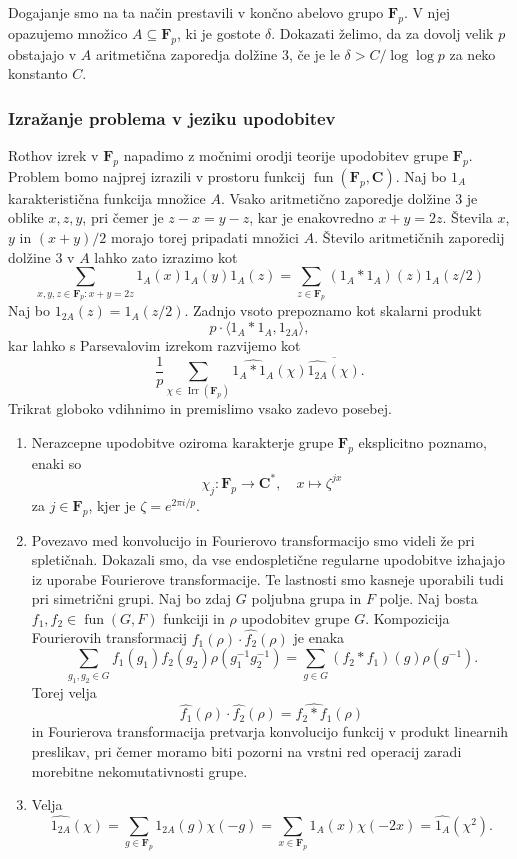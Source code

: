 \documentclass[11pt]{book}
\def\CC{\mathbf{C}}
\def\FF{\mathbf{F}}
\DeclareMathOperator\Irr{Irr}
\DeclareMathOperator\fun{fun}
\theoremstyle{definition}
\theoremstyle{zgled}
\theoremstyle{odprtproblem}
\theoremstyle{domacanaloga}
\theoremstyle{izrek}
\begin{document}
Dogajanje smo na ta način prestavili v končno abelovo grupo $\FF_p$. V njej opazujemo množico $A \subseteq \FF_p$, ki je gostote $\delta$. Dokazati želimo, da za dovolj velik $p$ obstajajo v $A$ aritmetična zaporedja dolžine $3$, če je le $\delta > C/\log \log p$ za neko konstanto $C$. 

\subsubsection{Izražanje problema v jeziku upodobitev}

Rothov izrek v $\FF_p$ napadimo z močnimi orodji teorije upodobitev grupe $\FF_p$. Problem bomo najprej izrazili v prostoru funkcij $\fun(\FF_p, \CC)$. Naj bo $1_A$ karakteristična funkcija množice $A$. Vsako aritmetično zaporedje dolžine $3$ je oblike $x,z,y$, pri čemer je $z-x = y-z$, kar je enakovredno $x+y=2z$. Števila $x$, $y$ in $(x+y)/2$ morajo torej pripadati množici $A$. Število aritmetičnih zaporedij dolžine $3$ v $A$ lahko zato izrazimo kot
\[
    \sum_{x,y,z \in \FF_p : x+y=2z} 1_A(x) 1_A(y) 1_A(z)
    = \sum_{z \in \FF_p} \left( 1_A * 1_A \right)(z) 1_A(z/2)
\]
Naj bo $1_{2A}(z) = 1_A(z/2)$. Zadnjo vsoto prepoznamo kot skalarni produkt
\[
    p \cdot \langle 1_A * 1_A, 1_{2A} \rangle,
\]
kar lahko s Parsevalovim izrekom razvijemo kot
\[
    \frac{1}{p} \sum_{\chi \in \Irr(\FF_p)} \widehat{1_A*1_A}(\chi) \overline{\widehat{1_{2A}}(\chi)}.
\]
Trikrat globoko vdihnimo in premislimo vsako zadevo posebej. 

\begin{enumerate}
\item Nerazcepne upodobitve oziroma karakterje grupe $\FF_p$ eksplicitno poznamo, enaki so
\[
    \chi_j \colon \FF_p \to \CC^*, \quad
    x \mapsto \zeta^{j x}
\]
za $j \in \FF_p$, kjer je $\zeta = e^{2 \pi i/p}$. 

\item Povezavo med konvolucijo in Fourierovo transformacijo smo videli že pri spletičnah. Dokazali smo, da vse endospletične regularne upodobitve izhajajo iz uporabe Fourierove transformacije. Te lastnosti smo kasneje uporabili tudi pri simetrični grupi. Naj bo zdaj $G$ poljubna grupa in $F$ polje. Naj bosta $f_1, f_2 \in \fun(G,F)$ funkciji in $\rho$ upodobitev grupe $G$. Kompozicija Fourierovih transformacij $\widehat{f_1}(\rho) \cdot \widehat{f_2}(\rho)$ je enaka
\[
    \sum_{g_1, g_2 \in G} f_1(g_1) f_2(g_2) \rho(g_1^{-1} g_2^{-1}) =
    \sum_{g \in G} (f_2 * f_1)(g) \rho(g^{-1}).
\]
Torej velja
\[
    \widehat{f_1}(\rho) \cdot \widehat{f_2}(\rho) =
    \widehat{f_2 * f_1}(\rho)
\]
in Fourierova transformacija pretvarja konvolucijo funkcij v produkt linearnih preslikav, pri čemer moramo biti pozorni na vrstni red operacij zaradi morebitne nekomutativnosti grupe.

\item Velja
\[
    \widehat{1_{2A}}(\chi) = \sum_{g \in \FF_p} 1_{2A}(g) \chi(-g)
    = \sum_{x \in \FF_p} 1_A(x) \chi(-2x)
    = \widehat{1_A}(\chi^2).
\]
\end{enumerate}
\end{document}
